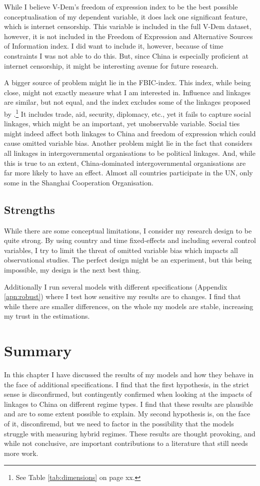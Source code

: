 While I believe V-Dem's freedom of expression index to be the best possible conceptualisation of my dependent variable, it does lack one significant feature, which is internet censorship. This variable is included in the full V-Dem dataset, however, it is not included in the Freedom of Expression and Alternative Sources of Information index. I did want to include it, however, because of time constraints I was not able to do this. But, since China is especially proficient at internet censorship, it might be interesting avenue for future research.

A bigger source of problem might lie in the FBIC-index. This index, while being close, might not exactly measure what I am interested in. Influence and linkages are similar, but not equal, and the index excludes some of the linkages proposed by \citet{levitsky_competitive_2010}.\footnote{See Table \ref{tab:dimensions} on page xx.} It includes trade, aid, security, diplomacy, etc., yet it fails to capture social linkages, which might be an important, yet unobservable variable. Social ties might indeed affect both linkages to China and freedom of expression which could cause omitted variable bias. Another problem might lie in the fact that \citep{moyer_china-us_2021} considers all linkages in intergovernmental organisations to be political linkages. And, while this is true to an extent, China-dominated intergovernmental organisations are far more likely to have an effect. Almost all countries participate in the UN, only some in the Shanghai Cooperation Organisation. 

\subsection{Strengths}
While there are some conceptual limitations, I consider my research design to be quite strong. By using country and time fixed-effects and including several control variables, I try to limit the threat of omitted variable bias which impacts all observational studies. The perfect design might be an experiment, but this being impossible, my design is the next best thing.

Additionally I run several models with different specifications (Appendix \ref{apn:robust}) where I test how sensitive my results are to changes. I find that while there are smaller differences, on the whole my models are stable, increasing my trust in the estimations.

\section{Summary}
In this chapter I have discussed the results of my models and how they behave in the face of additional specifications. I find that the first hypothesis, in the strict sense is disconfirmed, but contingently confirmed when looking at the impacts of linkages to China on different regime types. I find that these results are plausible and are to some extent possible to explain. My second hypothesis is, on the face of it, disconfiremd, but we need to factor in the possibility that the models struggle with measuring hybrid regimes. These results are thought provoking, and while not conclusive, are important contributions to a literature that still needs more work. 